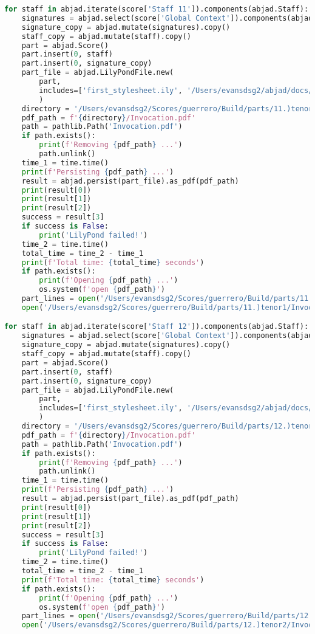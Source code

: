 \begin{lstlisting}[language=Python, caption=Invocation Source Code]
for staff in abjad.iterate(score['Staff 11']).components(abjad.Staff):
    signatures = abjad.select(score['Global Context']).components(abjad.Staff)
    signature_copy = abjad.mutate(signatures).copy()
    staff_copy = abjad.mutate(staff).copy()
    part = abjad.Score()
    part.insert(0, staff)
    part.insert(0, signature_copy)
    part_file = abjad.LilyPondFile.new(
        part,
        includes=['first_stylesheet.ily', '/Users/evansdsg2/abjad/docs/source/_stylesheets/abjad.ily'],
        )
    directory = '/Users/evansdsg2/Scores/guerrero/Build/parts/11.)tenor1'
    pdf_path = f'{directory}/Invocation.pdf'
    path = pathlib.Path('Invocation.pdf')
    if path.exists():
        print(f'Removing {pdf_path} ...')
        path.unlink()
    time_1 = time.time()
    print(f'Persisting {pdf_path} ...')
    result = abjad.persist(part_file).as_pdf(pdf_path)
    print(result[0])
    print(result[1])
    print(result[2])
    success = result[3]
    if success is False:
        print('LilyPond failed!')
    time_2 = time.time()
    total_time = time_2 - time_1
    print(f'Total time: {total_time} seconds')
    if path.exists():
        print(f'Opening {pdf_path} ...')
        os.system(f'open {pdf_path}')
    part_lines = open('/Users/evansdsg2/Scores/guerrero/Build/parts/11.)tenor1/Invocation.ly').readlines()
    open('/Users/evansdsg2/Scores/guerrero/Build/parts/11.)tenor1/Invocation.ly', 'w').writelines(part_lines[15:-1])

for staff in abjad.iterate(score['Staff 12']).components(abjad.Staff):
    signatures = abjad.select(score['Global Context']).components(abjad.Staff)
    signature_copy = abjad.mutate(signatures).copy()
    staff_copy = abjad.mutate(staff).copy()
    part = abjad.Score()
    part.insert(0, staff)
    part.insert(0, signature_copy)
    part_file = abjad.LilyPondFile.new(
        part,
        includes=['first_stylesheet.ily', '/Users/evansdsg2/abjad/docs/source/_stylesheets/abjad.ily'],
        )
    directory = '/Users/evansdsg2/Scores/guerrero/Build/parts/12.)tenor2'
    pdf_path = f'{directory}/Invocation.pdf'
    path = pathlib.Path('Invocation.pdf')
    if path.exists():
        print(f'Removing {pdf_path} ...')
        path.unlink()
    time_1 = time.time()
    print(f'Persisting {pdf_path} ...')
    result = abjad.persist(part_file).as_pdf(pdf_path)
    print(result[0])
    print(result[1])
    print(result[2])
    success = result[3]
    if success is False:
        print('LilyPond failed!')
    time_2 = time.time()
    total_time = time_2 - time_1
    print(f'Total time: {total_time} seconds')
    if path.exists():
        print(f'Opening {pdf_path} ...')
        os.system(f'open {pdf_path}')
    part_lines = open('/Users/evansdsg2/Scores/guerrero/Build/parts/12.)tenor2/Invocation.ly').readlines()
    open('/Users/evansdsg2/Scores/guerrero/Build/parts/12.)tenor2/Invocation.ly', 'w').writelines(part_lines[15:-1])


\end{lstlisting}
